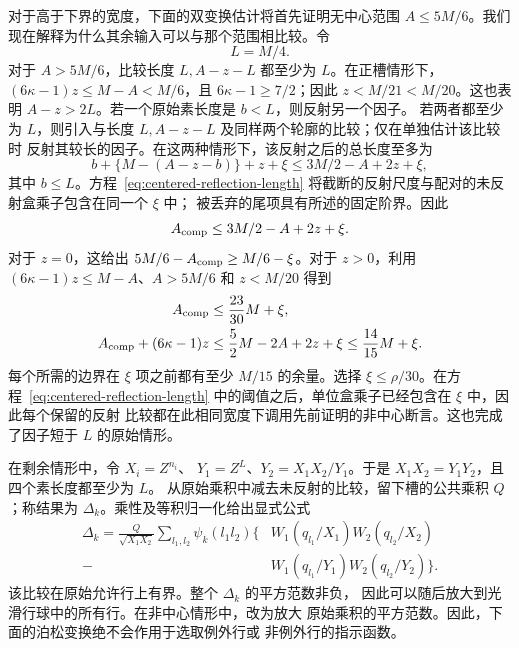 \documentclass[11pt,a4paper]{article}
\numberwithin{equation}{section}
\numberwithin{figure}{section}
\theoremstyle{definition}
\theoremstyle{remark}
\begin{document}
对于高于下界的宽度，下面的双变换估计将首先证明无中心范围 \(A\le5M/6\)。我们现在解释为什么其余输入可以与那个范围相比较。令
\begin{equation}
 L=M/4.
 \label{old-eq:2.2}
\end{equation}
对于 \(A>5M/6\)，比较长度 \(L,A-z-L\) 都至少为 \(L\)。在正槽情形下，\((6\kappa-1)z\le M-A<M/6\)，且 \(6\kappa-1\ge7/2\)；因此 \(z<M/21<M/20\)。这也表明 \(A-z>2L\)。若一个原始素长度是 \(b<L\)，则反射另一个因子。
若两者都至少为 \(L\)，则引入与长度
\(L,A-z-L\) 及同样两个轮廓的比较；仅在单独估计该比较时
反射其较长的因子。在这两种情形下，该反射之后的总长度至多为
\[
 b+\{M-(A-z-b)\}+z+\xi
 \le 3M/2-A+2z+\xi,
\]
其中 \(b\le L\)。方程~\eqref{eq:centered-reflection-length}
将截断的反射尺度与配对的未反射盒乘子包含在同一个 \(\xi\) 中；
被丢弃的尾项具有所述的固定阶界。因此
\begin{equation}
 A_{\rm comp}\le3M/2-A+2z+\xi.
 \label{old-eq:3.11}
\end{equation}
对于 \(z=0\)，这给出
\(5M/6-A_{\rm comp}\ge M/6-\xi\)。对于 \(z>0\)，利用
\((6\kappa-1)z\le M-A\)、\(A>5M/6\) 和 \(z<M/20\) 得到
\begin{equation}
 \begin{aligned}
 A_{\rm comp}&\le\frac{23}{30}M+\xi,\\
 A_{\rm comp}+(6\kappa-1)z
 &\le\frac52M-2A+2z+\xi\le\frac{14}{15}M+\xi.
 \end{aligned}
 \label{eq:comparison-uncentered-margin}
\end{equation}
每个所需的边界在 \(\xi\) 项之前都有至少 \(M/15\) 的余量。选择
\(\xi\le\rho/30\)。在方程~\eqref{eq:centered-reflection-length}
中的阈值之后，单位盒乘子已经包含在 \(\xi\) 中，因此每个保留的反射
比较都在此相同宽度下调用先前证明的非中心断言。这也完成了因子短于
\(L\) 的原始情形。

在剩余情形中，令 \(X_i=Z^{n_i}\)、
\(Y_1=Z^L\)、\(Y_2=X_1X_2/Y_1\)。于是
\(X_1X_2=Y_1Y_2\)，且四个素长度都至少为 \(L\)。
从原始乘积中减去未反射的比较，留下槽的公共乘积 \(Q\)；称结果为
\(\Delta_k\)。乘性及等积归一化给出显式公式
\[
 \begin{split}
 \Delta_k
 =\frac{Q}{\sqrt{X_1X_2}}\sum_{l_1,l_2}\psi_k(l_1l_2)
 \bigl\{
 &W_1(q_{l_1}/X_1)W_2(q_{l_2}/X_2)\\
 -{}&W_1(q_{l_1}/Y_1)W_2(q_{l_2}/Y_2)
 \bigr\}.
 \end{split}
\]
该比较在原始允许行上有界。整个 \(\Delta_k\) 的平方范数非负，
因此可以随后放大到光滑行球中的所有行。在非中心情形中，改为放大
原始乘积的平方范数。因此，下面的泊松变换绝不会作用于选取例外行或
非例外行的指示函数。
\end{document}

